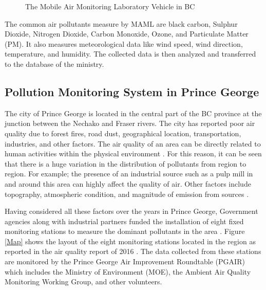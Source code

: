 \begin{enumerate}
\begin{figure}[h]
    \caption{ The Mobile Air Monitoring Laboratory Vehicle in BC \cite{MAML}}
    
    
    \label{MAML}
   \end{figure}

   \vspace{5mm}



  



The common air pollutants measure by MAML are black carbon, Sulphur Dioxide, Nitrogen Dioxide, Carbon Monoxide, Ozone, and Particulate Matter (PM). 
It also measures meteorological data like wind speed, wind direction, temperature, and humidity.
The collected data is then analyzed and transferred to the database of the ministry.

\end{enumerate}



 \subsection{Pollution Monitoring System in Prince George}
 

 The city of Prince George is located in the central part of the BC province at the junction between the Nechako and Fraser rivers. The city has reported poor air quality due to forest fires, road dust, geographical location, transportation, industries, and other factors.
The air quality of an area can be directly related to human activities within the physical environment \cite{manisalidis2020environmental}.
 For this reason, it can be seen that there is a huge variation in the distribution of pollutants from region to region. For example; the presence of an industrial source such as a pulp mill in and around this area can highly affect the quality of air. Other factors include topography, atmospheric condition, and magnitude of emission from sources \cite{Prevention2000}. 
 
  

 Having considered all these factors over the years in Prince George, Government agencies along with industrial partners funded the installation of eight fixed monitoring stations to measure the dominant pollutants in the area \cite{Authority2011}. Figure \ref{Map} shows the layout of the eight monitoring stations located in the region as reported in the air quality report of 2016 \cite{Environment2016}. The data collected from these stations are monitored by the Prince George Air Improvement Roundtable (PGAIR)  which includes the Ministry of Environment (MOE), the Ambient Air Quality Monitoring Working Group, and other volunteers.
 




